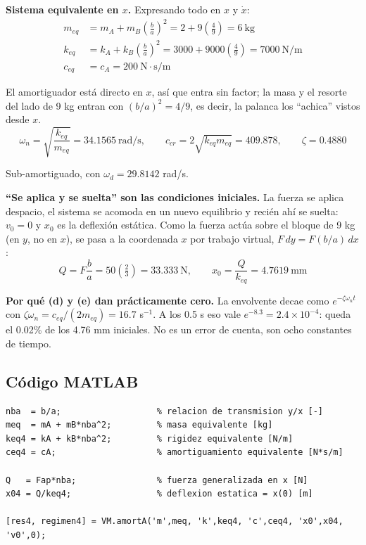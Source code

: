 \documentclass[12pt,letterpaper]{article}
\begin{document}
\textbf{Sistema equivalente en $x$.} Expresando todo en $x$ y $\dot{x}$:
\begin{align}
m_{eq} &= m_A + m_B\left(\tfrac{b}{a}\right)^2 = 2 + 9\left(\tfrac{4}{9}\right) = 6\ \text{kg} \\
k_{eq} &= k_A + k_B\left(\tfrac{b}{a}\right)^2 = 3000 + 9000\left(\tfrac{4}{9}\right) = 7000\ \text{N/m} \\
c_{eq} &= c_A = 200\ \text{N}\cdot\text{s/m}
\end{align}

El amortiguador está directo en $x$, así que entra sin factor; la masa y el resorte
del lado de 9 kg entran con $(b/a)^2 = 4/9$, es decir, la palanca los ``achica''
vistos desde $x$.
\begin{equation}
\omega_n = \sqrt{\frac{k_{eq}}{m_{eq}}} = 34.1565\ \text{rad/s}, \qquad
c_{cr} = 2\sqrt{k_{eq}m_{eq}} = 409.878, \qquad
\zeta = 0.4880
\end{equation}

Sub-amortiguado, con $\omega_d = 29.8142$ rad/s.

\textbf{``Se aplica y se suelta'' son las condiciones iniciales.} La fuerza se aplica
despacio, el sistema se acomoda en un nuevo equilibrio y recién ahí se suelta: $v_0 = 0$
y $x_0$ es la deflexión estática. Como la fuerza actúa sobre el bloque de 9 kg (en $y$,
no en $x$), se pasa a la coordenada $x$ por trabajo virtual, $F\,dy = F(b/a)\,dx$:
\begin{equation}
Q = F\frac{b}{a} = 50\left(\tfrac{2}{3}\right) = 33.333\ \text{N},
\qquad
x_0 = \frac{Q}{k_{eq}} = 4.7619\ \text{mm}
\end{equation}

\textbf{Por qué (d) y (e) dan prácticamente cero.} La envolvente decae como
$e^{-\zeta\omega_n t}$ con $\zeta\omega_n = c_{eq}/(2m_{eq}) = 16.7$ s$^{-1}$. A los
0.5 s eso vale $e^{-8.3} = 2.4\times10^{-4}$: queda el 0.02\% de los 4.76 mm
iniciales. No es un error de cuenta, son ocho constantes de tiempo.

\subsection{Código MATLAB}
\begin{lstlisting}[style=matlab,numbers=none]
nba  = b/a;                   % relacion de transmision y/x [-]
meq  = mA + mB*nba^2;         % masa equivalente [kg]
keq4 = kA + kB*nba^2;         % rigidez equivalente [N/m]
ceq4 = cA;                    % amortiguamiento equivalente [N*s/m]

Q   = Fap*nba;                % fuerza generalizada en x [N]
x04 = Q/keq4;                 % deflexion estatica = x(0) [m]

[res4, regimen4] = VM.amortA('m',meq, 'k',keq4, 'c',ceq4, 'x0',x04, 'v0',0);
\end{lstlisting}
\end{document}
